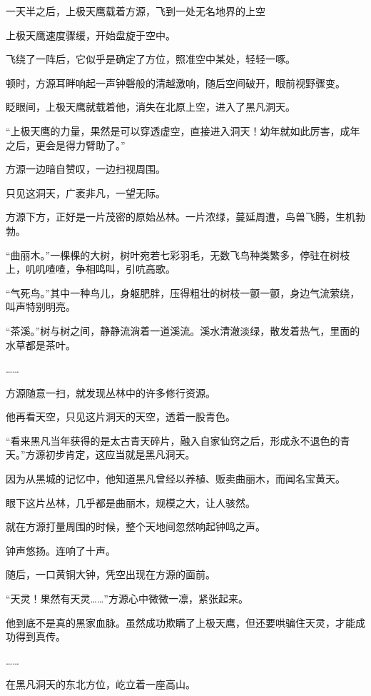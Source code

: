 
\begin{this_body}

一天半之后，上极天鹰载着方源，飞到一处无名地界的上空

上极天鹰速度骤缓，开始盘旋于空中。

飞绕了一阵后，它似乎是确定了方位，照准空中某处，轻轻一啄。

顿时，方源耳畔响起一声钟磬般的清越激响，随后空间破开，眼前视野骤变。

眨眼间，上极天鹰就载着他，消失在北原上空，进入了黑凡洞天。

“上极天鹰的力量，果然是可以穿透虚空，直接进入洞天！幼年就如此厉害，成年之后，更会是得力臂助了。”

方源一边暗自赞叹，一边扫视周围。

只见这洞天，广袤非凡，一望无际。

方源下方，正好是一片茂密的原始丛林。一片浓绿，蔓延周遭，鸟兽飞腾，生机勃勃。

“曲丽木。”一棵棵的大树，树叶宛若七彩羽毛，无数飞鸟种类繁多，停驻在树枝上，叽叽喳喳，争相鸣叫，引吭高歌。

“气死鸟。”其中一种鸟儿，身躯肥胖，压得粗壮的树枝一颤一颤，身边气流萦绕，叫声特别明亮。

“茶溪。”树与树之间，静静流淌着一道溪流。溪水清澈淡绿，散发着热气，里面的水草都是茶叶。

……

方源随意一扫，就发现丛林中的许多修行资源。

他再看天空，只见这片洞天的天空，透着一股青色。

“看来黑凡当年获得的是太古青天碎片，融入自家仙窍之后，形成永不退色的青天。”方源初步肯定，这应当就是黑凡洞天。

因为从黑城的记忆中，他知道黑凡曾经以养植、贩卖曲丽木，而闻名宝黄天。

眼下这片丛林，几乎都是曲丽木，规模之大，让人骇然。

就在方源打量周围的时候，整个天地间忽然响起钟鸣之声。

钟声悠扬。连响了十声。

随后，一口黄铜大钟，凭空出现在方源的面前。

“天灵！果然有天灵……”方源心中微微一凛，紧张起来。

他到底不是真的黑家血脉。虽然成功欺瞒了上极天鹰，但还要哄骗住天灵，才能成功得到真传。

……

在黑凡洞天的东北方位，屹立着一座高山。


\end{this_body}
